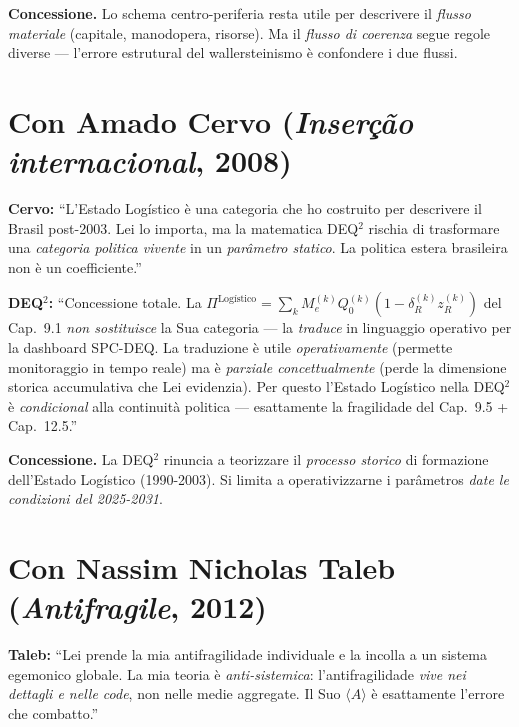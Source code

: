 \textbf{Concessione.} Lo schema centro-periferia resta utile per
descrivere il \emph{flusso materiale} (capitale, manodopera, risorse).
Ma il \emph{flusso di coerenza} segue regole diverse --- l'errore
estrutural del wallersteinismo è confondere i due flussi.



\section{\texorpdfstring{Con Amado Cervo (\emph{Inserção internacional},
2008)}{Con Amado Cervo (Inserção internacional, 2008)}}\label{con-amado-cervo-inseruxe7uxe3o-internacional-2008}

\textbf{Cervo:} ``L'Estado Logístico è una categoria che ho costruito
per descrivere il Brasil post-2003. Lei lo importa, ma la matematica
DEQ$^2$ rischia di trasformare una \emph{categoria politica vivente} in un
\emph{parâmetro statico}. La politica estera brasileira non è un
coefficiente.''

\textbf{DEQ$^2$:} ``Concessione totale. La
\(\Pi^{\text{Logístico}} = \sum_k M_e^{(k)} Q_0^{(k)} (1 - \delta_R^{(k)} z_R^{(k)})\)
del Cap.~9.1 \emph{non sostituisce} la Sua categoria --- la
\emph{traduce} in linguaggio operativo per la dashboard SPC-DEQ. La
traduzione è utile \emph{operativamente} (permette monitoraggio in tempo
reale) ma è \emph{parziale concettualmente} (perde la dimensione storica
accumulativa che Lei evidenzia). Per questo l'Estado Logístico nella
DEQ$^2$ è \emph{condicional} alla continuità politica --- esattamente la
fragilidade del Cap.~9.5 + Cap.~12.5.''

\textbf{Concessione.} La DEQ$^2$ rinuncia a teorizzare il \emph{processo
storico} di formazione dell'Estado Logístico (1990-2003). Si limita a
operativizzarne i parâmetros \emph{date le condizioni del 2025-2031}.



\section{\texorpdfstring{Con Nassim Nicholas Taleb (\emph{Antifragile},
2012)}{Con Nassim Nicholas Taleb (Antifragile, 2012)}}\label{con-nassim-nicholas-taleb-antifrágil-2012}

\textbf{Taleb:} ``Lei prende la mia antifragilidade individuale e la
incolla a un sistema egemonico globale. La mia teoria è
\emph{anti-sistemica}: l'antifragilidade \emph{vive nei dettagli e nelle
code}, non nelle medie aggregate. Il Suo \(\langle A\rangle\) è
esattamente l'errore che combatto.''

